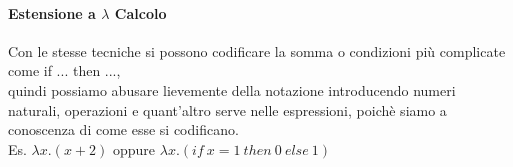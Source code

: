 \documentclass[a4paper,12pt]{article}
\begin{document}
\paragraph{Estensione a $\lambda$ Calcolo\\}
Con le stesse tecniche si possono codificare la somma o condizioni più complicate come if ... then ...,\\
quindi possiamo abusare lievemente della notazione introducendo numeri naturali, operazioni e quant'altro serve nelle espressioni, poichè siamo a conoscenza di come esse si codificano.\\
Es. $\lambda x.(x+2)$ oppure $\lambda x.(if\ x = 1\ then\ 0\ else\ 1)$\\
\end{document}
